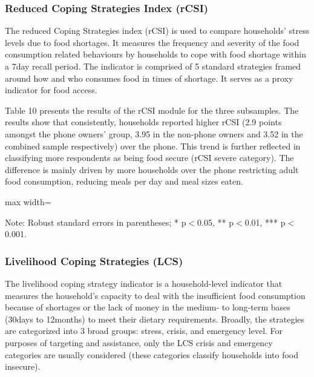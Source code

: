\documentclass[11pt,harvard]{article}
\begin{document}
\pagebreak	
	
	
\subsubsection{Reduced Coping Strategies Index (rCSI)}

The reduced Coping Strategies index (rCSI) is used to compare households’ stress levels due to food shortages. It measures the frequency and severity of the food consumption related behaviours by households to cope with food shortage within a 7day recall period. The indicator is comprised of 5 standard strategies framed around how and who consumes food in times of shortage. It serves as a proxy indicator for food access.

Table 10 presents the results of the rCSI module for the three subsamples. The results show that consistently, households reported higher rCSI (2.9 points amongst the phone owners' group, 3.95 in the non-phone owners and 3.52 in the combined sample respectively) over the phone. This trend is further reflected in classifying more respondents as being food secure (rCSI severe category). The difference is mainly driven by more households over the phone restricting adult food consumption, reducing meals per day and meal sizes eaten.
	
	
	\begin{table}[htbp]
		\centering
		\begin{adjustbox}{max width=\textwidth}
			\begin{threeparttable}
				\caption{Impact of Survey Modality on Reduced Coping Strategy Index Classification}
				\scriptsize
				 
				\label{tab:rCSI_Modality_CAR}
				\begin{tablenotes}
					\item Note: Robust standard errors in parentheses; * p$<$0.05, ** p$<$0.01, *** p$<$0.001.
				\end{tablenotes}
			\end{threeparttable}
		\end{adjustbox}
	\end{table}

	
\subsubsection{Livelihood Coping Strategies (LCS)}

The livelihood coping strategy indicator is a household-level indicator that measures the household's capacity to deal with the insufficient food consumption because of shortages or the lack of money in the medium- to long-term bases (30days to 12months) to meet their dietary requirements. Broadly, the strategies are categorized into 3 broad groups: stress, crisis, and emergency level. For purposes of targeting and assistance, only the LCS crisis and emergency categories are usually considered (these categories classify households into food insecure).
	
\end{document}
